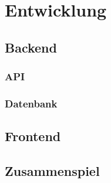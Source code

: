 \chapter{Entwicklung}

\section{Backend}
\subsection{API}
\subsection{Datenbank}

\section{Frontend}

\section{Zusammenspiel}